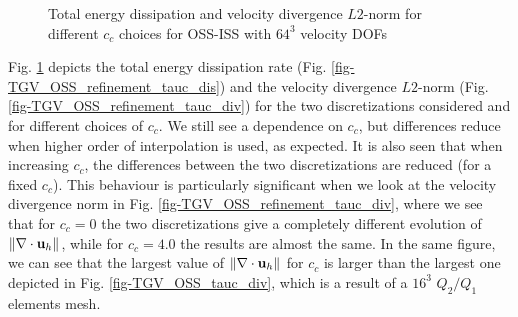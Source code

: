 \begin{figure}[h!]
  \centering
  \caption{Total energy dissipation and velocity divergence $L2$-norm for different $c_c$ choices for OSS-ISS with $64^3$ velocity DOFs}
  \label{fig-TGV_OSS_refinement_tauc_divvel}
\end{figure}
Fig. \ref{fig-TGV_OSS_refinement_tauc_divvel} depicts the total energy dissipation rate (Fig. \ref{fig-TGV_OSS_refinement_tauc_dis})  and the velocity divergence $L2$-norm (Fig. \ref{fig-TGV_OSS_refinement_tauc_div}) for the two discretizations considered and for different choices of $c_c$. We still see a dependence on $c_c$, but differences reduce when higher order of interpolation is used, as expected. It is also seen that when increasing $c_c$, the differences between the two discretizations are reduced (for a fixed $c_c$). This behaviour is particularly significant when we look at the velocity divergence norm in Fig. \ref{fig-TGV_OSS_refinement_tauc_div}, where we see that for $c_c=0$ the two discretizations give a completely different evolution of $\|\nabla\cdot{\bf u}_h\|$, while for $c_c=4.0$ the results are almost the same. In the same figure, we can see that the largest value of $\|\nabla\cdot{\bf u}_h\|$ for $c_c$ is larger than the largest one depicted in Fig. \ref{fig-TGV_OSS_tauc_div}, which is a result of a $16^3$ $Q_2/Q_1$ elements mesh. 

